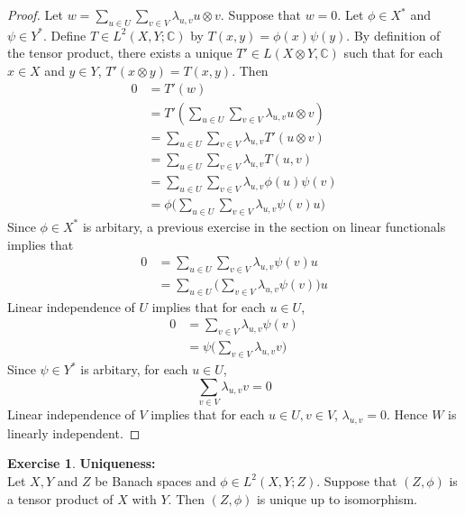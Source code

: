 \documentclass[12pt]{amsart}
\theoremstyle{definition}
\newtheorem{ex}[definition]{Exercise}
\newcommand{\lam}{\lambda}
\newcommand{\C}{\mathbb{C}}
\begin{document}
	\begin{proof}
	Let $w = \sum\limits_{u \in U} \sum\limits_{v \in V}\lam_{u,v} u \otimes v$. Suppose that $w = 0$. Let $\phi \in X^*$ and $\psi \in Y^*$. Define $T \in L^2(X, Y; \C)$ by $T(x,y) = \phi(x)\psi(y)$. By definition of the tensor product, there exists a unique $T' \in L(X \otimes Y, \C)$ such that for each $x \in X$ and $y \in Y$, $T'(x \otimes y) = T(x,y)$. Then 
	\begin{align*}
	0 
	&= T'(w) \\
	&= T'(\sum\limits_{u \in U} \sum\limits_{v \in V}\lam_{u,v} u \otimes v) \\
	&= \sum\limits_{u \in U} \sum\limits_{v \in V}\lam_{u,v} T'(u \otimes v) \\
	&= \sum\limits_{u \in U} \sum\limits_{v \in V}\lam_{u,v} T(u, v) \\
	&= \sum\limits_{u \in U} \sum\limits_{v \in V}\lam_{u,v} \phi(u)\psi(v) \\
	&= \phi\bigg( \sum\limits_{u \in U} \sum\limits_{v \in V}\lam_{u,v}  \psi(v) u \bigg)
	\end{align*}
	Since $\phi \in X^*$ is arbitary, a previous exercise in the section on linear functionals implies that 
	\begin{align*}
	0 
	&= \sum\limits_{u \in U} \sum\limits_{v \in V}\lam_{u,v}  \psi(v) u \\
	&= \sum\limits_{u \in U} \bigg (\sum\limits_{v \in V}\lam_{u,v}  \psi(v)  \bigg) u
	\end{align*}
	Linear independence of $U$ implies that for each $u \in U$, 
	\begin{align*}
	0 
	&= \sum\limits_{v \in V}\lam_{u,v}  \psi(v) \\
	&= \psi \bigg( \sum\limits_{v \in V}\lam_{u,v}  v \bigg )
	\end{align*}
	Since $\psi \in Y^*$ is arbitary, for each $u \in U$, $$\sum\limits_{v \in V}\lam_{u,v}  v = 0$$
	Linear independence of $V$ implies that for each $u \in U, v \in V$, $\lam_{u,v} = 0$. Hence $W$ is linearly independent. 
	\end{proof}
	
	\begin{ex} \textbf{Uniqueness:}\\
	Let $X, Y$ and $Z$ be Banach spaces and $\phi \in L^2(X,Y ; Z)$. Suppose that $(Z, \phi)$ is a tensor product of $X$ with $Y$. Then $(Z, \phi)$ is unique up to isomorphism. 
	\end{ex}
	
\end{document}
